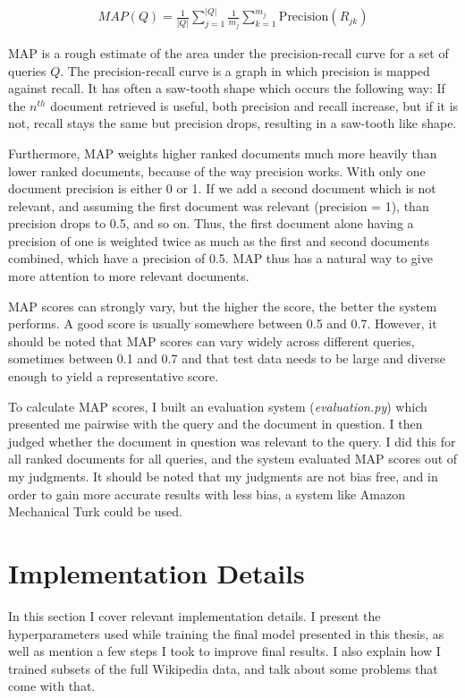 \begin{gather}
  MAP(Q) = \frac{1}{|Q|}\displaystyle\sum_{j=1}^{|Q|} {\frac{1}{m_j} \displaystyle\sum_{k=1}^{m_j}{\text{Precision}(R_{jk})}}
\end{gather}

MAP is a rough estimate of the area under the precision-recall curve for a set of queries $Q$. The precision-recall curve is a graph
in which precision is mapped against recall. It has often a saw-tooth shape which occurs the following way: If the $n^{th}$
document retrieved is useful, both precision and recall increase, but if it is not, recall stays the same but precision drops,
resulting in a saw-tooth like shape.

Furthermore, MAP weights higher ranked documents much more heavily than lower ranked documents, because of the way precision
works. With only one document precision is either 0 or 1. If we add a second document which is not relevant, and assuming the first
document was relevant (precision = 1), than precision drops to 0.5, and so on. Thus, the first document alone having a precision
of one is weighted twice as much as the first and second documents combined, which have a precision of 0.5. MAP thus has a natural
way to give more attention to more relevant documents.

MAP scores can strongly vary, but the higher the score, the better the system performs. A good score is usually somewhere between 0.5
and 0.7. However, it should be noted that MAP scores can vary widely across different queries, sometimes between 0.1 and 0.7 and
that test data needs to be large and diverse enough to yield a representative score.

To calculate MAP scores, I built an evaluation system (\textit{evaluation.py}) which presented me pairwise with the query and the
document in question. I then judged whether the document in question was relevant to the query. I did this for all ranked documents
for all queries, and the system evaluated MAP scores out of my judgments. It should be noted that my judgments are not bias free,
and in order to gain more accurate results with less bias, a system like Amazon Mechanical Turk could be used.

\section{Implementation Details}

In this section I cover relevant implementation details. I present the hyperparameters used while training the final model
presented in this thesis, as well as mention a few steps I took to improve final results. I also explain how I trained
subsets of the full Wikipedia data, and talk about some problems that come with that.

